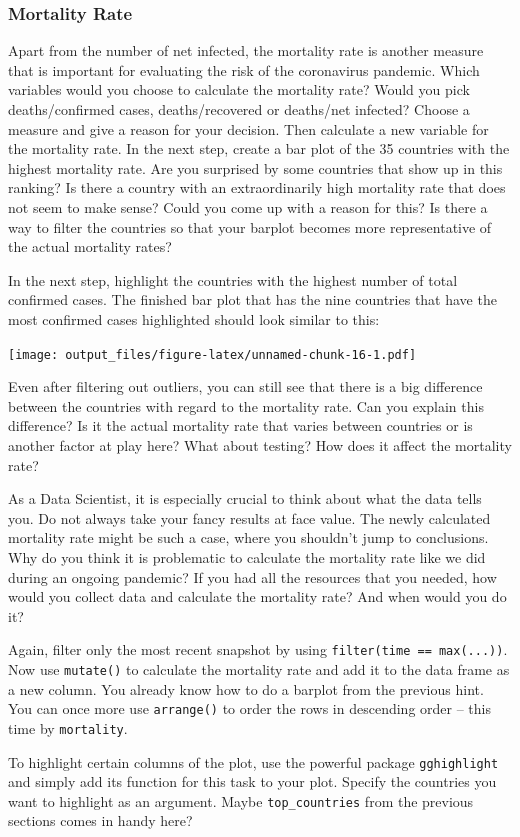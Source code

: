 \documentclass[
  11pt,
]{article}
\newenvironment{tips}[1]
  {
  \begin{itemize}
  \footnotesize
  \renewcommand{\labelitemi}{
    \raisebox{-.7\height}[0pt][0pt]{
      {\setkeys{Gin}{width=3em,keepaspectratio}
        \texttt{[image: images/\#1.png]}}
    }
  }
  \setlength{\fboxsep}{1em}
  \begin{rbox}
  \item
  }
  {
  \end{rbox}
  \end{itemize}
  }
\begin{document}
\hypertarget{mortality-rate}{%
\subsubsection{Mortality Rate}\label{mortality-rate}}

Apart from the number of net infected, the mortality rate is another measure that is important for evaluating the risk of the coronavirus pandemic. Which variables would you choose to calculate the mortality rate? Would you pick deaths/confirmed cases, deaths/recovered or deaths/net infected? Choose a measure and give a reason for your decision. Then calculate a new variable for the mortality rate. In the next step, create a bar plot of the 35 countries with the highest mortality rate. Are you surprised by some countries that show up in this ranking? Is there a country with an extraordinarily high mortality rate that does not seem to make sense? Could you come up with a reason for this? Is there a way to filter the countries so that your barplot becomes more representative of the actual mortality rates?

In the next step, highlight the countries with the highest number of total confirmed cases.
The finished bar plot that has the nine countries that have the most confirmed cases highlighted should look similar to this:

\texttt{[image: output\_files/figure-latex/unnamed-chunk-16-1.pdf]}

Even after filtering out outliers, you can still see that there is a big difference between the countries with regard to the mortality rate. Can you explain this difference? Is it the actual mortality rate that varies between countries or is another factor at play here? What about testing? How does it affect the mortality rate?

As a Data Scientist, it is especially crucial to think about what the data tells you. Do not always take your fancy results at face value. The newly calculated mortality rate might be such a case, where you shouldn't jump to conclusions. Why do you think it is problematic to calculate the mortality rate like we did during an ongoing pandemic? If you had all the resources that you needed, how would you collect data and calculate the mortality rate? And when would you do it?

\begin{tips}r

Again, filter only the most recent snapshot by using \texttt{filter(time\ ==\ max(...))}. Now use \texttt{mutate()} to calculate the mortality rate and add it to the data frame as a new column. You already know how to do a barplot from the previous hint. You can once more use \texttt{arrange()} to order the rows in descending order -- this time by \texttt{mortality}.

To highlight certain columns of the plot, use the powerful package \texttt{gghighlight} and simply add its function for this task to your plot. Specify the countries you want to highlight as an argument. Maybe \texttt{top\_countries} from the previous sections comes in handy here?

\end{tips}
\end{document}
